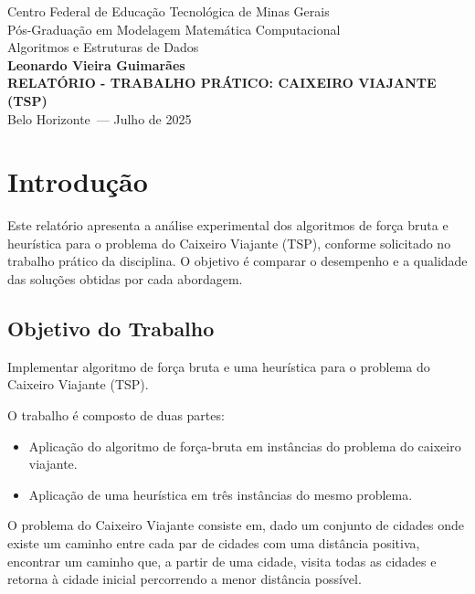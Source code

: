 \documentclass{article}
\newcommand{\instituicao}{Centro Federal de Educação Tecnológica de Minas Gerais}
\newcommand{\programa}{Pós-Graduação em Modelagem Matemática Computacional}
\newcommand{\curso}{Algoritmos e Estruturas de Dados}
\newcommand{\autor}{Leonardo Vieira Guimarães}
\newcommand{\titulo}{Relatório - Trabalho Prático: Caixeiro Viajante (TSP)}
\newcommand{\cidade}{Belo Horizonte}
\newcommand{\dataentrega}{Julho de 2025}
\begin{document}
\begin{titlepage}
    \begin{center}
        {\fontsize{12}{16}\selectfont \instituicao}\\[0.7cm]
        {\fontsize{12}{16}\selectfont \programa}\\[0.7cm]
        {\fontsize{12}{16}\selectfont \curso}\\[0.7cm]
        {\fontsize{12}{16}\selectfont \textbf{\autor}}\\[6cm]
        {\fontsize{18}{20}\selectfont \MakeUppercase{\textbf{\titulo}}}\\[7cm]
        {\fontsize{14}{16}\selectfont \cidade\ --- \dataentrega}
    \end{center}
\end{titlepage}
\thispagestyle{empty}
\newpage
\renewcommand{\contentsname}{Sumário}
\tableofcontents
\newpage

\section{Introdução}
Este relatório apresenta a análise experimental dos algoritmos de força bruta e heurística para o problema do Caixeiro Viajante (TSP), conforme solicitado no trabalho prático da disciplina. O objetivo é comparar o desempenho e a qualidade das soluções obtidas por cada abordagem.

\subsection*{Objetivo do Trabalho}
Implementar algoritmo de força bruta e uma heurística para o problema do Caixeiro Viajante (TSP).

O trabalho é composto de duas partes:
\begin{itemize}
    \item Aplicação do algoritmo de força-bruta em instâncias do problema do caixeiro viajante.
    \item Aplicação de uma heurística em três instâncias do mesmo problema.
\end{itemize}

O problema do Caixeiro Viajante consiste em, dado um conjunto de cidades onde existe um caminho entre cada par de cidades com uma distância positiva, encontrar um caminho que, a partir de uma cidade, visita todas as cidades e retorna à cidade inicial percorrendo a menor distância possível.
\end{document}
